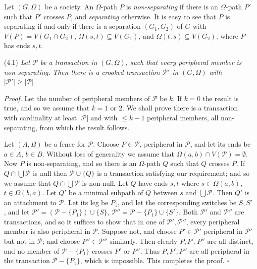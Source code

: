 
Let $(G, \Omega)$ be a society. An $\Omega$-path $P$ is \textit{non-separating} if there is an $\Omega$-path $P'$ such that $P'$ crosses $P$, and \textit{separating} otherwise. It is easy to see that $P$ is separating if and only if there is a separation $(G_1, G_2)$ of $G$ with $V(P) = V(G_1 \cap G_2)$, $\Omega(s, t) \subseteq V(G_1)$, and $\Omega(t, s) \subseteq V(G_2)$, where $P$ has ends $s, t$.

\stmt
(4.1) \textit{Let $\mathscr{P}$ be a transaction in $(G, \Omega)$, such that every peripheral member is non-separating. Then there is a crooked transaction $\mathscr{P}'$ in $(G, \Omega)$ with $|\mathscr{P}'| \ge |\mathscr{P}|$.}

\textit{Proof.} Let the number of peripheral members of $\mathscr{P}$ be $k$. If $k = 0$ the result is true, and so we assume that $k = 1$ or $2$. We shall prove there is a transaction with cardinality at least $|\mathscr{P}|$ and with $\le k - 1$ peripheral members, all non-separating, from which the result follows.

Let $(A, B)$ be a fence for $\mathscr{P}$. Choose $P \in \mathscr{P}$, peripheral in $\mathscr{P}$, and let its ends be $a \in A$, $b \in B$. Without loss of generality we assume that $\Omega(a, b) \cap V(\mathscr{P}) = \emptyset$. Now $P$ is non-separating, and so there is an $\Omega$-path $Q$ such that $Q$ crosses $P$. If $Q \cap \bigcup \mathscr{P}$ is null then $\mathscr{P} \cup \{Q\}$ is a transaction satisfying our requirement; and so we assume that $Q \cap \bigcup \mathscr{P}$ is non-null. Let $Q$ have ends $s, t$ where $s \in \Omega(a, b)$, $t \in \Omega(b, a)$. Let $Q'$ be a minimal subpath of $Q$ between $s$ and $\bigcup \mathscr{P}$. Then $Q'$ is an attachment to $\mathscr{P}$. Let its leg be $P_1$, and let the corresponding switches be $S, S'$, and let $\mathscr{P}' = (\mathscr{P} - \{P_1\}) \cup \{S\}$, $\mathscr{P}'' = \mathscr{P} - \{P_1\} \cup \{S'\}$. Both $\mathscr{P}'$ and $\mathscr{P}''$ are transactions, and so it suffices to show that in one of $\mathscr{P}', \mathscr{P}''$, every peripheral member is also peripheral in $\mathscr{P}$. Suppose not, and choose $P' \in \mathscr{P}'$ peripheral in $\mathscr{P}'$ but not in $\mathscr{P}$; and choose $P'' \in \mathscr{P}''$ similarly. Then clearly $P, P', P''$ are all distinct, and no member of $\mathscr{P} - \{P_1\}$ crosses $P'$ or $P''$. Thus $P, P', P''$ are all peripheral in the transaction $\mathscr{P} - \{P_1\}$, which is impossible. This completes the proof. $\square$


